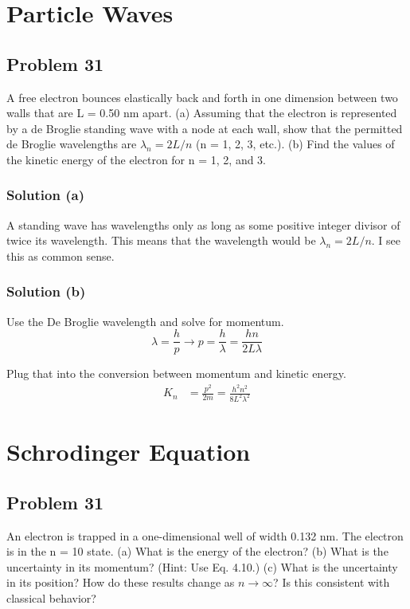 \documentclass[12pt]{report}
\begin{document}
\setcounter{chapter}{3}
\chapter{Particle Waves}

\pagebreak
\section{Problem 31}
    A free electron bounces elastically back and forth in one dimension between two walls that are L = 0.50 nm apart.
    (a) Assuming that the electron is represented by a de Broglie standing wave with a node at each wall, show that the permitted de Broglie wavelengths are $\lambda_n = 2L/n$ (n = 1, 2, 3, etc.).
    (b) Find the values of the kinetic energy of the electron for n = 1, 2, and 3.

    \subsection{Solution (a)}
        A standing wave has wavelengths only as long as some positive integer divisor of twice its wavelength.
        This means that the wavelength would be $\lambda_n = 2L/n$.
        I see this as common sense.

    \subsection{Solution (b)}
        Use the De Broglie wavelength and solve for momentum.
        \begin{equation}
            \lambda = \frac{h}{p} \to p = \frac{h}{\lambda} = \frac{hn}{2L\lambda}
        \end{equation}

        Plug that into the conversion between momentum and kinetic energy.
        \begin{align}
            K_n &=  \frac{p^2}{2m} = \frac{h^2 n^2}{8L^2 \lambda^2}
        \end{align}

\chapter{Schrodinger Equation}

\pagebreak
\section{Problem 31}
    An electron is trapped in a one-dimensional well of width 0.132 nm. 
    The electron is in the n = 10 state. 
    (a) What is the energy of the electron? 
    (b) What is the uncertainty in its momentum? (Hint: Use Eq. 4.10.) 
    (c) What is the uncertainty in its position? How do these results change as $n \to \infty$? 
    Is this consistent with classical behavior?
\end{document}
